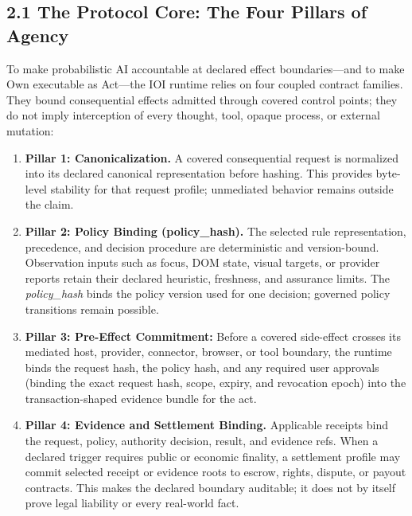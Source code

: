 \documentclass[
  11pt,
]{article}
\providecommand{\tightlist}{%
  \setlength{\itemsep}{0pt}\setlength{\parskip}{0pt}}
\begin{document}
\hypertarget{the-protocol-core-the-four-pillars-of-agency}{%
\subsection{2.1 The Protocol Core: The Four Pillars of
Agency}\label{the-protocol-core-the-four-pillars-of-agency}}

To make probabilistic AI accountable at declared effect boundaries---and to
make Own executable as Act---the IOI runtime relies on four coupled contract
families. They bound consequential effects admitted through covered control
points; they do not imply interception of every thought, tool, opaque process,
or external mutation:

\begin{enumerate}
\def\labelenumi{\arabic{enumi}.}
\tightlist
\item
  \textbf{Pillar 1: Canonicalization.} A covered consequential request is
  normalized into its declared canonical representation before hashing. This
  provides byte-level stability for that request profile; unmediated behavior
  remains outside the claim.
\item
  \textbf{Pillar 2: Policy Binding (policy\_hash).} The selected rule
  representation, precedence, and decision procedure are deterministic and
  version-bound. Observation inputs such as focus, DOM state, visual targets,
  or provider reports retain their declared heuristic, freshness, and assurance
  limits. The \emph{policy\_hash} binds the policy version used for one decision;
  governed policy transitions remain possible.
\item
  \textbf{Pillar 3: Pre-Effect Commitment:} Before a covered side-effect
  crosses its mediated host, provider, connector, browser, or tool boundary, the runtime
  binds the request hash, the policy hash, and any required user
  approvals (binding the exact request hash, scope, expiry, and
  revocation epoch) into the transaction-shaped evidence bundle for the
  act.
\item
  \textbf{Pillar 4: Evidence and Settlement Binding.} Applicable receipts
  bind the request, policy, authority decision, result, and evidence refs.
  When a declared trigger requires public or economic finality, a settlement
  profile may commit selected receipt or evidence roots to escrow, rights,
  dispute, or payout contracts. This makes the declared boundary auditable;
  it does not by itself prove legal liability or every real-world fact.
\end{enumerate}
\end{document}
